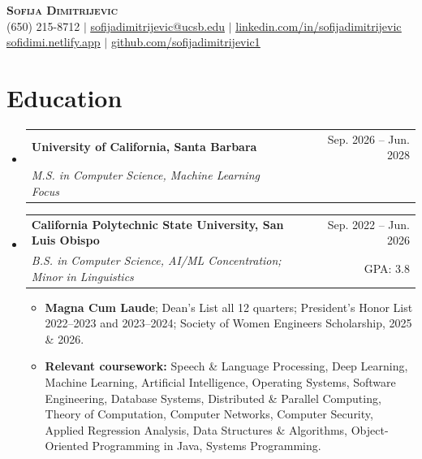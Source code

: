 \documentclass[letterpaper,11pt]{article}
\makeatletter
\newcommand{\resumeItem}[1]{\item\small{{#1 \vspace{-2pt}}}}
\newcommand{\resumeSubheading}[4]{
  \vspace{-2pt}\item
  \begin{tabular*}{0.97\textwidth}[t]{l@{\extracolsep{\fill}}r}
    \textbf{#1} & #2 \\
    \textit{\small #3} & {\small #4} \\
  \end{tabular*}\vspace{-7pt}
}
\newcommand{\resumeSubHeadingListStart}{\begin{itemize}[leftmargin=0.15in, label={}]}
\newcommand{\resumeSubHeadingListEnd}{\end{itemize}}
\newcommand{\resumeItemListStart}{\begin{itemize}[label={$\bullet$}]}
\newcommand{\resumeItemListEnd}{\end{itemize}\vspace{-5pt}}
\makeatother
\begin{document}
\begin{center}
  \textbf{\Huge \scshape Sofija Dimitrijevic} \\ \vspace{2pt}
  \small (650) 215-8712 $|$
  \href{mailto:sofijadimitrijevic@ucsb.edu}{\underline{sofijadimitrijevic@ucsb.edu}} $|$
  \href{https://linkedin.com/in/sofijadimitrijevic}{\underline{linkedin.com/in/sofijadimitrijevic}} \\
  \href{https://sofidimi.netlify.app}{\underline{sofidimi.netlify.app}} $|$
  \href{https://github.com/sofijadimitrijevic1}{\underline{github.com/sofijadimitrijevic1}}
\end{center}

\section{Education}
\resumeSubHeadingListStart
  \resumeSubheading
    {University of California, Santa Barbara}{Sep. 2026 -- Jun. 2028}
    {M.S. in Computer Science, Machine Learning Focus}{}
  \resumeSubheading
    {California Polytechnic State University, San Luis Obispo}{Sep. 2022 -- Jun. 2026}
    {B.S. in Computer Science, AI/ML Concentration; Minor in Linguistics}{GPA: 3.8}
    \resumeItemListStart
      \resumeItem{\textbf{Magna Cum Laude}; Dean's List all 12 quarters; President's Honor List 2022--2023 and 2023--2024; Society of Women Engineers Scholarship, 2025 \& 2026.}
      \resumeItem{\textbf{Relevant coursework:} Speech \& Language Processing, Deep Learning, Machine Learning, Artificial Intelligence, Operating Systems, Software Engineering, Database Systems, Distributed \& Parallel Computing, Theory of Computation, Computer Networks, Computer Security, Applied Regression Analysis, Data Structures \& Algorithms, Object-Oriented Programming in Java, Systems Programming.}
    \resumeItemListEnd
\resumeSubHeadingListEnd

\end{document}

